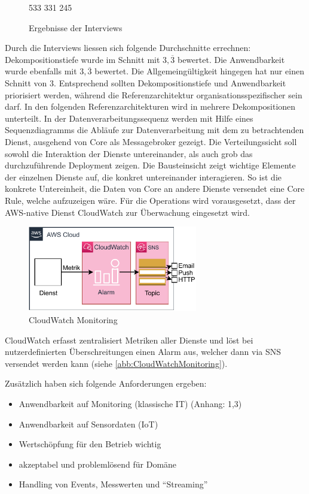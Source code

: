 \begin{figure}[H]
\centering
\spideroverview
{5}{3}{3}
{3}{3}{1}
{2}{4}{5}
\caption{Ergebnisse der Interviews}
\label{abb:DimensionenUebersicht}
\end{figure}
Durch die Interviews liessen sich folgende Durchschnitte errechnen: Dekompositionstiefe wurde im Schnitt mit $3,\overline{3}$ bewertet. Die Anwendbarkeit wurde ebenfalls mit $3,\overline{3}$ bewertet. Die Allgemeingültigkeit hingegen hat nur einen Schnitt von $3$. Entsprechend sollten Dekompositionstiefe und Anwendbarkeit priorisiert werden, während die Referenzarchitektur organisationsspezifischer sein darf. 
In den folgenden Referenzarchitekturen wird in mehrere Dekompositionen unterteilt. In der Datenverarbeitungssequenz werden mit Hilfe eines Sequenzdiagramms die Abläufe zur Datenverarbeitung mit dem zu betrachtenden Dienst, ausgehend von \AWSIOT{} Core als Messagebroker gezeigt.
Die Verteilungssicht soll sowohl die Interaktion der Dienste untereinander, als auch grob das durchzuführende Deployment zeigen. Die Bausteinsicht zeigt wichtige Elemente der einzelnen Dienste auf, die konkret untereinander interagieren. So ist die konkrete Untereinheit, die Daten von \AWSIOT{} Core an andere Dienste versendet eine \AWSIOT{} Core Rule, welche aufzuzeigen wäre. 
Für die Operations wird vorausgesetzt, dass der \ac{AWS}-native Dienst CloudWatch zur Überwachung eingesetzt wird. 
\begin{figure}[H]
\centering
\includegraphics[width=0.66\textwidth]{graphics/CloudWatch-Monitoring}
\caption{CloudWatch Monitoring}
\label{abb:CloudWatchMonitoring}
\end{figure}
CloudWatch erfasst zentralisiert Metriken aller Dienste und löst bei nutzerdefinierten Überschreitungen einen Alarm aus, welcher dann via \ac{SNS} versendet werden kann (siehe \autoref{abb:CloudWatchMonitoring}).



Zusätzlich haben sich folgende Anforderungen ergeben:
\begin{itemize}
\item Anwendbarkeit auf Monitoring (klassische IT) (Anhang: 1,3)
\item Anwendbarkeit auf Sensordaten (\ac{IoT})
\item Wertschöpfung für den Betrieb wichtig
\item akzeptabel und problemlösend für Domäne
\item Handling von Events, Messwerten und \enquote{Streaming}
\end{itemize}

